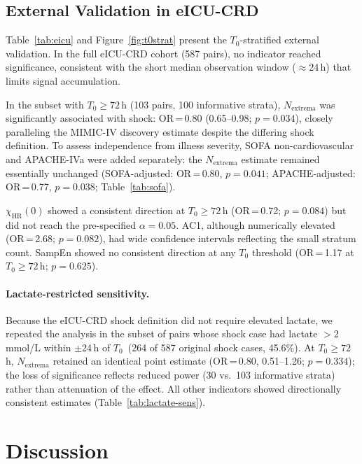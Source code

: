 \documentclass[12pt,a4paper]{article}
\newcommand{\Tzero}{$T_0$}
\begin{document}
\subsection{External Validation in eICU-CRD}
\label{sec:eicu-results}

Table~\ref{tab:eicu} and Figure~\ref{fig:t0strat} present the
$T_0$-stratified external validation.
In the full eICU-CRD cohort (587 pairs), no indicator reached significance,
consistent with the short median observation window ($\approx$24\,h) that
limits signal accumulation.

In the subset with $T_0\geq 72$\,h (103 pairs, 100 informative strata),
$N_{\text{extrema}}$ was significantly associated with shock:
OR\,=\,0.80 (0.65--0.98; $p=0.034$), closely paralleling the MIMIC-IV
discovery estimate despite the differing shock definition.
To assess independence from illness severity, SOFA non-cardiovascular and
APACHE-IVa were added separately: the $N_{\text{extrema}}$ estimate
remained essentially unchanged (SOFA-adjusted: OR\,=\,0.80, $p=0.041$;
APACHE-adjusted: OR\,=\,0.77, $p=0.038$; Table~\ref{tab:sofa}).

$\chi_{\text{HR}}(0)$ showed a consistent direction at $T_0\geq 72$\,h
(OR\,=\,0.72; $p=0.084$) but did not reach the pre-specified $\alpha=0.05$.
AC1, although numerically elevated (OR\,=\,2.68; $p=0.082$), had wide
confidence intervals reflecting the small stratum count.
SampEn showed no consistent direction at any $T_0$ threshold
(OR\,=\,1.17 at $T_0\geq72$\,h; $p=0.625$).

\paragraph{Lactate-restricted sensitivity.}
Because the eICU-CRD shock definition did not require elevated lactate,
we repeated the analysis in the subset of pairs whose shock case had
lactate $>$2\,mmol/L within $\pm$24\,h of \Tzero\ (264 of 587 original
shock cases, 45.6\%).
At $T_0\geq72$\,h, $N_{\text{extrema}}$ retained an identical point
estimate (OR\,=\,0.80, 0.51--1.26; $p=0.334$); the loss of significance
reflects reduced power (30 vs.\ 103 informative strata) rather than
attenuation of the effect.
All other indicators showed directionally consistent estimates
(Table~\ref{tab:lactate-sens}).

\section{Discussion}
\label{sec:discussion}
\end{document}
